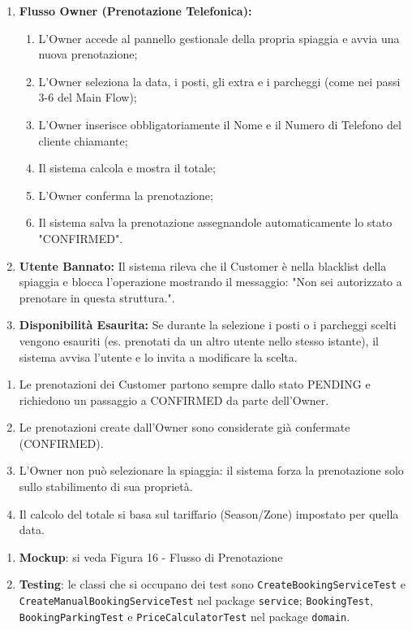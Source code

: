 \documentclass{article}
\begin{document}
	{
		\begin{enumerate}[nosep, leftmargin=36px]
			\item[\textbf{1a.}] \textbf{Flusso Owner (Prenotazione Telefonica):}
			\begin{enumerate}[nosep, leftmargin=*]
				\item[i.] L'Owner accede al pannello gestionale della propria spiaggia e avvia una nuova prenotazione;
				\item[ii.] L'Owner seleziona la data, i posti, gli extra e i parcheggi (come nei passi 3-6 del Main Flow);
				\item[iii.] L'Owner inserisce obbligatoriamente il Nome e il Numero di Telefono del cliente chiamante;
				\item[iv.] Il sistema calcola e mostra il totale;
				\item[v.] L'Owner conferma la prenotazione;
				\item[vi.] Il sistema salva la prenotazione assegnandole automaticamente lo stato "CONFIRMED".
			\end{enumerate}
			\item[\textbf{2a-e.}] \textbf{Utente Bannato:} Il sistema rileva che il Customer è nella blacklist della spiaggia e blocca l'operazione mostrando il messaggio: "Non sei autorizzato a prenotare in questa struttura.".
			\item[\textbf{4/6a-e.}] \textbf{Disponibilità Esaurita:} Se durante la selezione i posti o i parcheggi scelti vengono esauriti (es. prenotati da un altro utente nello stesso istante), il sistema avvisa l'utente e lo invita a modificare la scelta.
		\end{enumerate}
	}
	{
		\begin{enumerate}[nosep, leftmargin=*]
			\item[•] Le prenotazioni dei Customer partono sempre dallo stato PENDING e richiedono un passaggio a CONFIRMED da parte dell'Owner.
			\item[•] Le prenotazioni create dall'Owner sono considerate già confermate (CONFIRMED). 
			\item[•] L'Owner non può selezionare la spiaggia: il sistema forza la prenotazione solo sullo stabilimento di sua proprietà.
			\item[•] Il calcolo del totale si basa sul tariffario (Season/Zone) impostato per quella data.
		\end{enumerate}
		
		\begin{enumerate}[leftmargin=*]
			\item[•] \textbf{Mockup}: si veda Figura 16 - Flusso di Prenotazione
			
			\item[•] \textbf{Testing}: le classi che si occupano dei test sono \texttt{CreateBookingServiceTest} e \texttt{CreateManualBookingServiceTest} nel package \texttt{service}; \texttt{BookingTest}, \texttt{BookingParkingTest} e \texttt{PriceCalculatorTest} nel package \texttt{domain}.
		\end{enumerate}
	}
		
\end{document}
